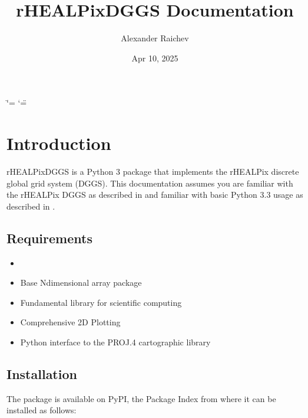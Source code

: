 \documentclass[a4paper,12ptopenany,oneside,english]{sphinxmanual}
\title{rHEALPixDGGS Documentation}
\date{Apr 10, 2025}
\author{Alexander Raichev}
\begin{document}
\ifdefined\shorthandoff
  \ifnum\catcode`\=\string=\active\shorthandoff{=}\fi
  \ifnum\catcode`\"=\active{}\fi
\fi

\pagestyle{empty}
\sphinxmaketitle
\pagestyle{plain}
\sphinxtableofcontents
\pagestyle{normal}
\label{\detokenize{index::doc}}


\sphinxstepscope


\chapter{Introduction}
\label{\detokenize{introduction:introduction}}\label{\detokenize{introduction::doc}}
\sphinxAtStartPar
rHEALPixDGGS is a Python 3 package that implements the rHEALPix discrete global grid system (DGGS).
This documentation assumes you are familiar with the rHEALPix DGGS as described in  and familiar with basic Python 3.3 usage as described in .


\section{Requirements}
\label{\detokenize{introduction:requirements}}\begin{itemize}
\item {} 
\sphinxAtStartPar
{}

\item {} 
\sphinxAtStartPar
{} Base N\sphinxhyphen{}dimensional array package

\item {} 
\sphinxAtStartPar
{} Fundamental library for scientific computing

\item {} 
\sphinxAtStartPar
{} Comprehensive 2D Plotting

\item {} 
\sphinxAtStartPar
{}
Python interface to the PROJ.4 cartographic library

\end{itemize}


\section{Installation}
\label{\detokenize{introduction:installation}}
\sphinxAtStartPar
The package is available on PyPI, the Package Index from where it can be installed as follows:
\end{document}
